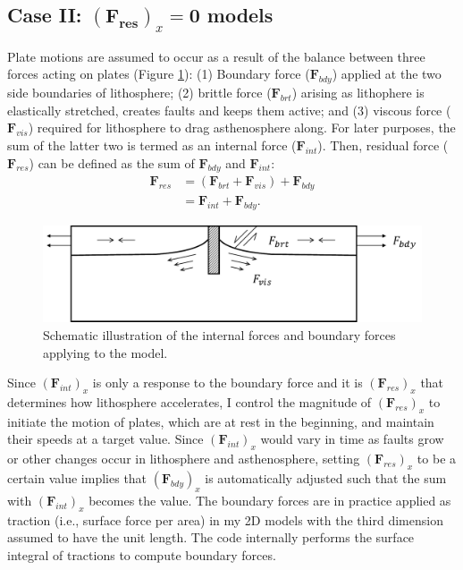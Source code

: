 \documentclass[letterpaper,12pt,notitle]{memphisthesis}                     %
\begin{document}
\subsection{Case II: $(\boldsymbol{F_{res}})_x \mathbf{=0}$ models}

Plate motions are assumed to occur as a result of the balance between three forces acting on plates (Figure \ref{fig:forcescheme}): (1) Boundary force ($\mathbf{F}_{bdy}$) applied at the two side boundaries of lithosphere; (2) brittle force ($\boldsymbol{F}_{brt}$) arising as lithophere is elastically stretched, creates faults and keeps them active; %
and (3) viscous force ($\boldsymbol{F}_{vis}$) required for lithosphere to drag asthenosphere along. 
For later purposes, the sum of the latter two is termed as an internal force ($\boldsymbol{F}_{int}$). Then, residual force ($\boldsymbol{F}_{res}$) can be defined as the sum of $\boldsymbol{F}_{bdy}$ and $\boldsymbol{F}_{int}$:
%
\begin{align} \label{Fres}
\mathbf{F}_{res} & = (\mathbf{F}_{brt} + \mathbf{F}_{vis}) + \mathbf{F}_{bdy} \\
 & = \mathbf{F}_{int} + \mathbf{F}_{bdy}.
\end{align}
%
\begin{figure}[!htb]
	\centering
	\includegraphics[width=0.7\linewidth]{./figs/force.pdf}
	\caption{Schematic illustration of the internal forces and boundary forces applying to the model.}
	\label{fig:forcescheme}
\end{figure}

Since $(\boldsymbol{F}_{int})_{x}$ is only a response to the boundary force and it is $(\boldsymbol{F}_{res})_{x}$ that determines how lithosphere accelerates, I control the magnitude of $(\boldsymbol{F}_{res})_{x}$ to initiate the motion of plates, which are at rest in the beginning, and maintain their speeds at a target value. Since $(\boldsymbol{F}_{int})_{x}$ would vary in time as faults grow or other changes occur in lithosphere and asthenosphere, setting $(\boldsymbol{F}_{res})_{x}$ %
to be a certain value implies that $(\boldsymbol{F}_{bdy})_{x}$ is automatically adjusted such that the sum with $(\boldsymbol{F}_{int})_{x}$ becomes the value. The boundary forces are in practice applied as traction (i.e., surface force per area) in my 2D models with the third dimension assumed to have the unit length. The code internally performs the surface integral of tractions to compute boundary forces.
\end{document}
